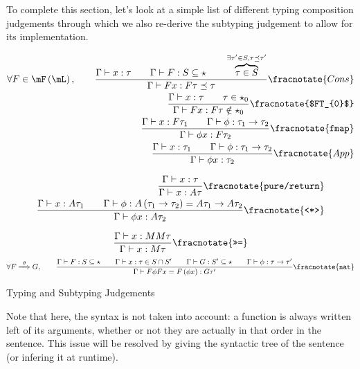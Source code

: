 \documentclass[math, english, info]{cours}
\def\cont{\Gamma\vdash}
\def\poulpe{\qquad}
\begin{document}
To complete this section, let's look at a simple list of different typing composition judgements through which we also re-derive the subtyping judgement to allow for its implementation.
\begin{table}
\begin{align*}
	\forall F \in \mF\left( \mL \right),\poulpe
	\frac{\cont x: \tau \poulpe \cont F: S\subseteq \star \poulpe \overbrace{\tau \in S}^{\exists \tau'\in S, \tau \preceq \tau'}}{\cont Fx: F\tau \preceq \tau}\fracnotate{Cons}\\
	\frac{\cont x: \tau \poulpe \tau \in \star_{0}}{\cont Fx: F\tau \notin \star_{0}}\fracnotate{$FT_{0}$}\\
	\frac{\cont x: F\tau_{1} \poulpe \cont \phi: \tau_{1} \to \tau_{2}}{\cont \phi x: F\tau_{2} }\fracnotate{\texttt{fmap}}\\
	\frac{\cont x: \tau_{1} \poulpe \cont \phi: \tau_{1} \to \tau_{2}}{\cont \phi x: \tau_{2}}\fracnotate{App}
\end{align*}

\begin{align*}
	\frac{\cont x: \tau}{\cont x: A\tau}\fracnotate{\texttt{pure/return}}\\
	\frac{\cont x: A\tau_{1} \poulpe \cont \phi: A\left( \tau_{1} \to \tau_{2} \right) = A\tau_{1} \to A\tau_{2}}{\cont \phi x: A\tau_{2}}\fracnotate{\texttt{<*>}}
\end{align*}

\begin{align*}
	\frac{\cont x: MM\tau}{\cont x: M\tau}\fracnotate{\texttt{>>=}}
\end{align*}
\begin{align*}
	\forall F \overset{\theta}{\Longrightarrow} G,\poulpe \frac{\cont F: S\subseteq \star \poulpe \cont x: \tau \in S \cap S' \poulpe \cont G: S' \subseteq \star \poulpe \cont \phi: \tau \to \tau'}{\cont F\phi Fx = F\left( \phi x \right): G\tau'}\fracnotate{\texttt{nat}}
\end{align*}

\caption{Typing and Subtyping Judgements}
\end{table}
Note that here, the syntax is not taken into account: a function is always written left of its arguments, whether or not they are actually in that order in the sentence.
This issue will be resolved by giving the syntactic tree of the sentence (or infering it at runtime).
\end{document}
